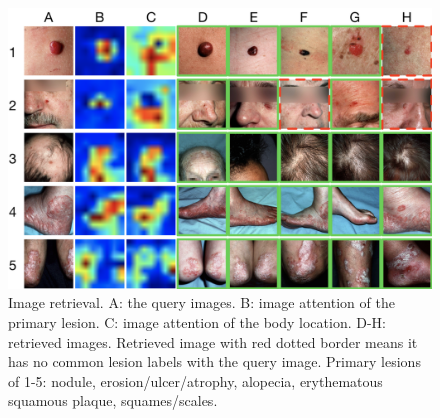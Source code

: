 \documentclass[letterpaper]{article}
\begin{document}
\begin{figure}[!ht]
  \centering
  \includegraphics[scale=0.45]{retrieval.png}
  \caption{Image retrieval. A: the query images. B: image attention of the primary lesion.
  C: image attention of the body location. D-H: retrieved images. Retrieved image
  with red dotted border means it has no common lesion labels with the query image.
  Primary lesions of 1-5: nodule, erosion/ulcer/atrophy, alopecia, erythematous
  squamous plaque, squames/scales.
  }
  \label{fig: retrival}
\end{figure}
\end{document}
